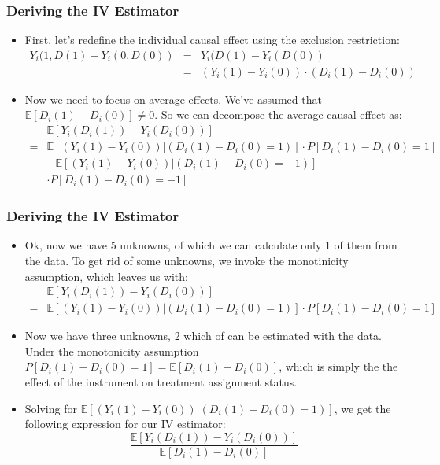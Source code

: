 \documentclass{beamer}
\begin{document}
\begin{frame}
  \frametitle{Deriving the IV Estimator}
  \begin{itemize}
  \item First, let's redefine the individual causal effect using the
    exclusion restriction:
\begin{eqnarray*}
Y_i(1,D(1)-Y_i(0,D(0))& =& Y_i(D(1)-Y_i(D(0))  \\
&=& (Y_i(1)-Y_i(0))\cdot (D_i(1)-D_i(0))
\end{eqnarray*}
\item Now we need to focus on average effects. We've assumed that
  $\mathbb{E}[D_i(1)-D_i(0)] \neq 0$. So we can decompose the average
  causal effect as:
  \begin{eqnarray*}
   & \mathbb{E}[Y_i(D_i(1))-Y_i(D_i(0))] \\
 = & \mathbb{E}[(Y_i(1)-Y_i(0))|(D_i(1)-D_i(0)=1)] \cdot
 P[D_i(1)-D_i(0)=1] \\
&-\mathbb{E}[(Y_i(1)-Y_i(0))|(D_i(1)-D_i(0)=-1)] \\ 
&\cdot
 P[D_i(1)-D_i(0)=-1]
  \end{eqnarray*}
  \end{itemize}
\end{frame}
\begin{frame}
  \frametitle{Deriving the IV Estimator}
  \begin{itemize}
  \item Ok, now we have 5 unknowns, of which we can calculate only
    1 of them from the data. To get rid of some unknowns, we invoke the monotinicity
    assumption, which leaves us with:
  \begin{eqnarray*}
   &\mathbb{E}[Y_i(D_i(1))-Y_i(D_i(0))]  \\
 = & \mathbb{E}[(Y_i(1)-Y_i(0))|(D_i(1)-D_i(0)=1)] \cdot
 P[D_i(1)-D_i(0)=1]
  \end{eqnarray*}
\item Now we have three unknowns, 2 which of can be estimated with the
  data. Under the monotonicity assumption  $P[D_i(1)-D_i(0)=1] =
  \mathbb{E}[D_i(1)-D_i(0)] $, which is simply the the effect of the
  instrument on treatment assignment status.
\item Solving for $\mathbb{E}[(Y_i(1)-Y_i(0))|(D_i(1)-D_i(0)=1)]$, we
  get the following expression for our IV estimator: $$\frac{\mathbb{E}[Y_i(D_i(1))-Y_i(D_i(0))] }{\mathbb{E}[D_i(1)-D_i(0)] }$$
  \end{itemize}
\end{frame}
\end{document}
